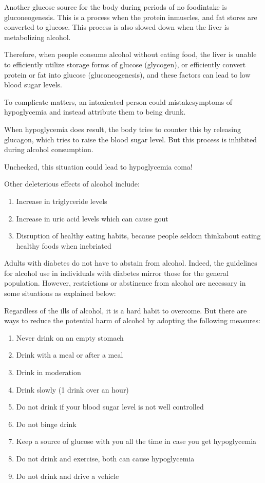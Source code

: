 Another glucose source for the body during periods of no food\break intake is gluconeogenesis. This is a process when the protein in\break muscles, and fat stores are converted to glucose. This process is also slowed down when the liver is metabolizing alcohol. 

Therefore, when people consume alcohol without eating food, the liver is unable to efficiently utilize storage forms of glucose (glycogen), or efficiently convert protein or fat into glucose (gluconeogenesis), and these factors can lead to low blood sugar levels.

To complicate matters, an intoxicated person could mistake\break symptoms of hypoglycemia and instead attribute them to being drunk. 

When hypoglycemia does result, the body tries to counter this by releasing glucagon, which tries to raise the blood sugar level. But this process is inhibited during alcohol consumption. 

Unchecked, this situation could lead to hypoglycemia coma!

\noindent Other deleterious effects of alcohol include:

\vspace{-\topsep}
\begin{enumerate}[•]
\itemsep=0pt
\item Increase in triglyceride levels
\item Increase in uric acid levels which can cause gout
\item Disruption of healthy eating habits, because people seldom think\break about eating healthy foods when inebriated
\end{enumerate}
\vspace{-\topsep}

Adults with diabetes do not have to abstain from alcohol. Indeed, the guidelines for alcohol use in individuals with diabetes mirror those for the general population. However, restrictions or abstinence from alcohol are necessary in some situations as explained below:

Regardless of the ills of alcohol, it is a hard habit to overcome. But there are ways to reduce the potential harm of alcohol by adopting the following measures:

\vspace{-\topsep}
\begin{enumerate}[•]
\itemsep=0pt
\item Never drink on an empty stomach
\item Drink with a meal or after a meal
\item Drink in moderation
\item Drink slowly (1 drink over an hour)
\item Do not drink if your blood sugar level is not well controlled
\item Do not binge drink
\item Keep a source of glucose with you all the time in case you get hypo\-glycemia
\item Do not drink and exercise, both can cause hypoglycemia
\item Do not drink and drive a vehicle
\end{enumerate}

